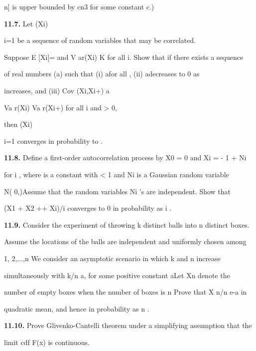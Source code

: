 n] is upper bounded by cn3 for some constant c.)

\textbf{11.7.} Let (Xi)\infty

i=1 be a sequence of random variables that may be correlated.

Suppose E [Xi]= \mu and V ar(Xi) \leq K for all i. Show that if there exists a sequence

of real numbers (a\tau)\tau{} such that (i) a\tau \in[ 0, 1] for all \tau, (ii) a\tau decreases to 0 as

\tau increases, and (iii) Cov (Xi,Xi+\tau) \leq a\tau

\sqrt

Va r(Xi) Va r(Xi+\tau) for all i and \tau> 0,

then (Xi)\infty

i=1 converges in probability to \mu.

\textbf{11.8.} Define a first-order autocorrelation process by X0 = 0 and Xi = \rhoXi- 1 + Ni

for i , where \rho is a constant with \vert\rho\vert < 1 and Ni is a Gaussian random variable

N( 0,)Assume that the random variables Ni 's are independent. Show that

(X1 + X2 +\cdot\cdot\cdot+ Xi)/i converges to 0 in probability as i \to\infty .

\textbf{11.9.} Consider the experiment of throwing k distinct balls into n distinct boxes.

Assume the locations of the balls are independent and uniformly chosen among

{1, 2,...,n }We consider an asymptotic scenario in which k and n increase

simultaneously with k/n \to a, for some positive constant aLet Xn denote the

number of empty boxes when the number of boxes is n Prove that X n/n \to e-a in

quadratic mean, and hence in probability as n \to\infty .

\textbf{11.10.} Prove Glivenko-Cantelli theorem under a simplifying assumption that the

limit cdf F(x) is continuous.
